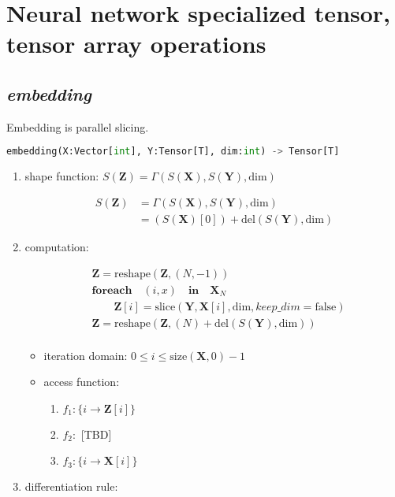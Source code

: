 \section{Neural network specialized tensor, tensor array operations}

\subsection{\textbf{\textit{embedding}}}

Embedding is parallel slicing.

\begin{lstlisting}[language=Python]
embedding(X:Vector[int], Y:Tensor[T], dim:int) -> Tensor[T]
\end{lstlisting}

\begin{enumerate}

\item shape function: $S(\mathbf{Z}) = \Gamma (S(\mathbf{X}), S(\mathbf{Y}), \text{dim})$

\begin{equation*}
  \begin{aligned}
    S(\mathbf{Z}) &= \Gamma (S(\mathbf{X}), S(\mathbf{Y}), \text{dim}) \\
     & = (S(\mathbf{X})[0]) + \text{del}(S(\mathbf{Y}), \text{dim})
  \end{aligned}
\end{equation*}

\item computation:

\begin{equation*}
  \begin{aligned}
    &\mathbf{Z} = \text{reshape}(\mathbf{Z}, (N, -1)) \\
    &\textbf{foreach} \quad (i, x) \quad \textbf{in} \quad \mathbf{X}_{N} \\
    &\quad \quad \mathbf{Z}[i] = \text{slice}(\mathbf{Y}, \mathbf{X}[i], \text{dim}, \textit{keep\_dim}=\text{false}) \\
    &\mathbf{Z} = \text{reshape}(\mathbf{Z}, (N)+\text{del}(S(\mathbf{Y}), \text{dim})) \\
  \end{aligned}
\end{equation*}

\begin{itemize}
  \item iteration domain: $0 \le i \le \text{size}(\mathbf{X}, 0) - 1$
  \item access function:
  \begin{enumerate}
    \item $f_1: \{ i \rightarrow \mathbf{Z}[i] \}$
    \item $f_2: $ [TBD]
    \item $f_3: \{i \rightarrow \mathbf{X}[i]\}$
  \end{enumerate}
\end{itemize}

\item differentiation rule:
\end{enumerate}
